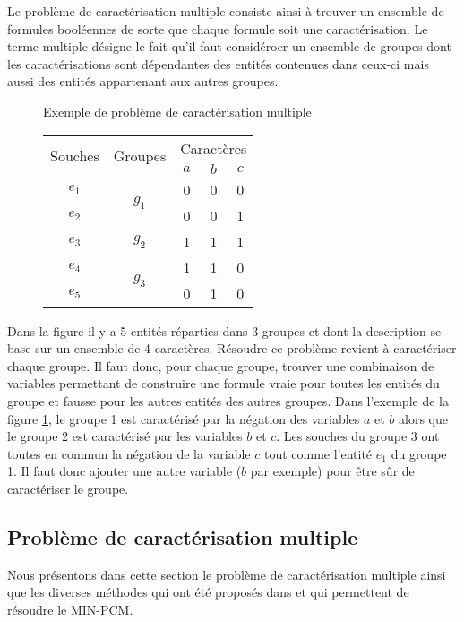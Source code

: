Le problème de caractérisation multiple consiste ainsi à trouver un ensemble de
formules booléennes de sorte que chaque formule soit une caractérisation. Le terme
multiple désigne le fait qu'il faut considéroer un ensemble de groupes dont les
caractérisations sont dépendantes des entités contenues dans ceux-ci mais aussi
des entités appartenant aux autres groupes.

\begin{figure}[H]{Exemple de problème de caractérisation multiple}
\begin{center}
\begin{tabular}{|c||c|c|c|c|}
\hline
\multirow{2}{*}{Souches}&\multirow{2}{*}{Groupes}&\multicolumn{3}{c|}{Caractères
}\\
&&$a$&$b$&$c$\\
\hline
\hline
$e_1$&\multirow{2}{*}{$g_1$}&\cellcolor{lightgray}0&\cellcolor{lightgray}0&0\\
\cline{1-1} \cline{3-5}
$e_2$&&\cellcolor{lightgray}0& \cellcolor{lightgray}0&1\\
\hline
\hline
$e_3$&$g_2$&1&\cellcolor{lightgray}1&\cellcolor{lightgray}1\\
\hline
\hline
$e_4$&\multirow{2}{*}{$g_3$}&1&\cellcolor{lightgray}1&\cellcolor{lightgray}0\\
\cline{1-1} \cline{3-5}
$e_5$&&0&\cellcolor{lightgray}1&\cellcolor{lightgray}0\\
\hline
\end{tabular}
\end{center}
\caption{}
\label{CD}
\end{figure}

Dans la figure  il y a 5 entités réparties dans 3 groupes et dont
la description se base sur un ensemble de 4 caractères.
Résoudre ce problème revient à caractériser chaque groupe. Il faut donc, pour
chaque groupe, trouver une combinaison de  variables permettant de construire une formule vraie pour toutes les
entités du groupe et fausse pour les autres entités des autres
groupes. Dans l'exemple de la figure \ref{CD}, le groupe 1 est caractérisé par
la négation des variables $a$ et $b$  alors que le groupe 2 est caractérisé par
les variables $b$ et $c$. Les souches du groupe 3 ont toutes en commun la
négation de la variable $c$ tout comme l'entité $e_1$ du groupe 1. Il faut donc
ajouter une autre variable ($b$ par exemple) pour être sûr de caractériser le
groupe.
\subsection{Problème de caractérisation multiple}
Nous présentons dans cette section le problème de caractérisation multiple ainsi que les diverses méthodes qui ont été proposés dans \cite{Chhel2012,Chhel2013} et qui permettent de résoudre le MIN-PCM.

